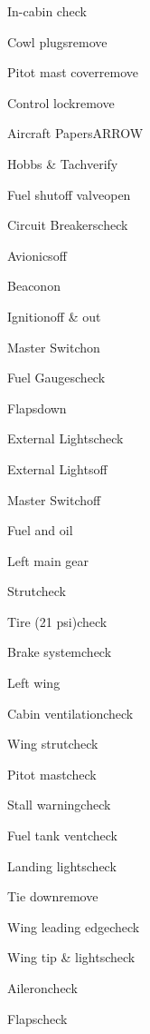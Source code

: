  




\begin{multicols}{2}
\begin{checklist}{In-cabin check}
  \item{Cowl plugs}{remove}
  \item{Pitot mast cover}{remove}
  \item{Control lock}{remove}
  \item{Aircraft Papers}{ARROW}
  \item{Hobbs \& Tach}{verify}
  \item{Fuel shutoff valve}{open}
  \item{Circuit Breakers}{check}
  \item{Avionics}{off}
  \item{Beacon}{on}
  \item{Ignition}{off \& out}
  \item{Master Switch}{on}
  \item{Fuel Gauges}{check}
  \item{Flaps}{down}
  \item{External Lights}{check}
  \item{External Lights}{off}
  \item{Master Switch}{off}
\end{checklist}

\begin{checklist}{Fuel and oil}
\end{checklist}

\begin{checklist}{Left main gear}
  \item{Strut}{check}
  \item{Tire (21 psi)}{check}
  \item{Brake system}{check}
\end{checklist}

\begin{checklist}{Left wing}
  \item{Cabin ventilation}{check}
  \item{Wing strut}{check}
  \item{Pitot mast}{check}
  \item{Stall warning}{check}
  \item{Fuel tank vent}{check}
  \item{Landing lights}{check}
  \item{Tie down}{remove}
  \item{Wing leading edge}{check}
  \item{Wing tip \& lights}{check}
  \item{Aileron}{check}
  \item{Flaps}{check}
\end{checklist}


\end{multicols}
